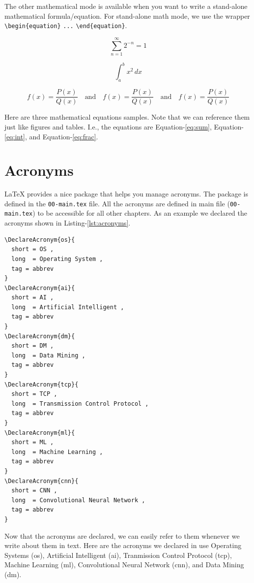 The other mathematical mode is available when you want to write a stand-alone mathematical formula/equation. For stand-alone math mode, we use the wrapper \verb|\begin{equation}| \verb|...| \verb|\end{equation}|.

\begin{equation}
    \sum_{n=1}^{\infty} 2^{-n} = 1
    \label{eq:sum}
\end{equation}

\begin{equation}
    \int_{a}^{b} x^2 \,dx
    \label{eq:int}
\end{equation}

\begin{equation}
    f(x)=\frac{P(x)}{Q(x)}\quad \textrm{and}\quad \textstyle f(x)=\frac{P(x)}{Q(x)}\quad \textrm{and}\quad \scriptstyle f(x)=\frac{P(x)}{Q(x)}
    \label{eq:frac}
\end{equation}

Here are three mathematical equations samples. Note that we can reference them just like figures and tables. I.e., the equations are Equation-\ref{eq:sum}, Equation-\ref{eq:int}, and Equation-\ref{eq:frac}. 

\section{Acronyms}
\label{sec:acronyms}

{\LaTeX} provides a nice package that helps you manage acronyms. The package is defined in the \texttt{00-main.tex} file. All the acronyms are defined in main file (\texttt{00-main.tex}) to be accessible for all other chapters. As an example we declared the acronyms shown in Listing-\ref{lst:acronyms}. 

\begin{lstlisting}[language=Tex,style=mystyle,caption={Sample Acronyms Declarations},label={lst:acronyms}]
\DeclareAcronym{os}{
  short = OS ,
  long  = Operating System ,
  tag = abbrev
}
\DeclareAcronym{ai}{
  short = AI ,
  long  = Artificial Intelligent ,
  tag = abbrev
}
\DeclareAcronym{dm}{
  short = DM ,
  long  = Data Mining ,
  tag = abbrev
}
\DeclareAcronym{tcp}{
  short = TCP ,
  long  = Transmission Control Protocol ,
  tag = abbrev
}
\DeclareAcronym{ml}{
  short = ML ,
  long  = Machine Learning ,
  tag = abbrev
}
\DeclareAcronym{cnn}{
  short = CNN ,
  long  = Convolutional Neural Network ,
  tag = abbrev
}
\end{lstlisting}


Now that the acronyms are declared, we can easily refer to them whenever we write about them in text. Here are the acronyms we declared in use Operating Systems (\ac{os}), Artificial Intelligent (\ac{ai}), Tranmission Control Protocol (\ac{tcp}), Machine Learning (\ac{ml}), Convolutional Neural Network (\ac{cnn}), and Data Mining (\ac{dm}). 